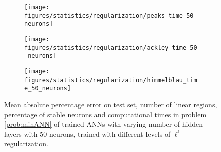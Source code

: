 \begin{figure}[H]
    \begin{subfigure}{.32\linewidth}
        \texttt{[image: figures/statistics/regularization/peaks\_time\_50\_neurons]}
    \end{subfigure}
    \begin{subfigure}{.32\linewidth}
        \texttt{[image: figures/statistics/regularization/ackley\_time\_50\_neurons]}
    \end{subfigure}
    \begin{subfigure}{.32\linewidth}
        \texttt{[image: figures/statistics/regularization/himmelblau\_time\_50\_neurons]}
    \end{subfigure}
    \begin{subfigure}{\linewidth}
            \centering
            
    \end{subfigure}
    \caption{Mean absolute percentage error on test set, number of linear regions, percentage of stable neurons and computational times in problem \eqref{prob:minANN} of trained ANNs with varying number of hidden layers with 50 neurons, trained with different levels of $\ell^1$ regularization.}
    \label{fig:model_statistics}%
\end{figure}


